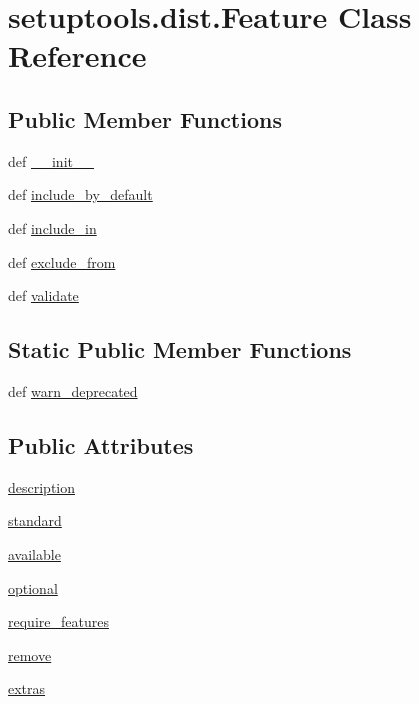 \hypertarget{classsetuptools_1_1dist_1_1Feature}{}\section{setuptools.\+dist.\+Feature Class Reference}
\label{classsetuptools_1_1dist_1_1Feature}
\subsection*{Public Member Functions}
\begin{DoxyCompactItemize}
\item 
def \hyperlink{classsetuptools_1_1dist_1_1Feature_ad81f233fcb265a4cbd2c3b459ed323e3}{\+\_\+\+\_\+init\+\_\+\+\_\+}
\item 
def \hyperlink{classsetuptools_1_1dist_1_1Feature_a6e756fbbc2f1928a4ad8ec691fd22021}{include\+\_\+by\+\_\+default}
\item 
def \hyperlink{classsetuptools_1_1dist_1_1Feature_a6b93826195078a971d057bf0f23c15bf}{include\+\_\+in}
\item 
def \hyperlink{classsetuptools_1_1dist_1_1Feature_ab68e46ca4c467ffd6386add275c54cf3}{exclude\+\_\+from}
\item 
def \hyperlink{classsetuptools_1_1dist_1_1Feature_a6437cc8e824d0a38576f250441243c85}{validate}
\end{DoxyCompactItemize}
\subsection*{Static Public Member Functions}
\begin{DoxyCompactItemize}
\item 
def \hyperlink{classsetuptools_1_1dist_1_1Feature_a9bd7a425fa886a22df4c2791a808c628}{warn\+\_\+deprecated}
\end{DoxyCompactItemize}
\subsection*{Public Attributes}
\begin{DoxyCompactItemize}
\item 
\hyperlink{classsetuptools_1_1dist_1_1Feature_abfd385a10c76be4b9f8f9c835f51546e}{description}
\item 
\hyperlink{classsetuptools_1_1dist_1_1Feature_a6bed2f1c5dd9deb63f88fa5dbc65d3cf}{standard}
\item 
\hyperlink{classsetuptools_1_1dist_1_1Feature_af9093aa520fcdcc91cc18f38274e6fb4}{available}
\item 
\hyperlink{classsetuptools_1_1dist_1_1Feature_a52f214040c829332ca5420e1cbe4ed3a}{optional}
\item 
\hyperlink{classsetuptools_1_1dist_1_1Feature_ada7c401027d0f0d6f828a2ffed58b6c3}{require\+\_\+features}
\item 
\hyperlink{classsetuptools_1_1dist_1_1Feature_a8d9c70cbfbf09b131734ce64698ae734}{remove}
\item 
\hyperlink{classsetuptools_1_1dist_1_1Feature_a07fa08608e87fc13cbb14e6d14fb0221}{extras}
\end{DoxyCompactItemize}


